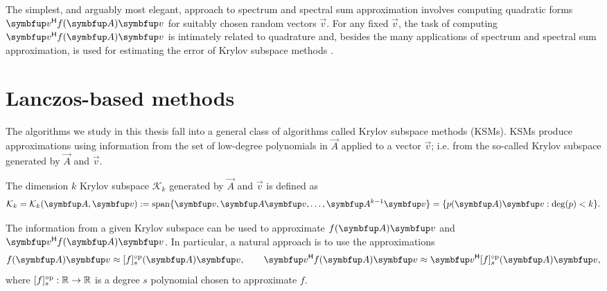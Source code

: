 The simplest, and arguably most elegant, approach to spectrum and spectral sum approximation involves computing quadratic forms \( \vec{v}^\cT \fA \vec{v} \) for suitably chosen random vectors \( \vec{v} \).
For any fixed \( \vec{v} \), the task of computing \( \vec{v}^\cT \fA \vec{v} \) is intimately related to quadrature \cite{golub_meurant_94,golub_meurant_09} and, besides the many applications of spectrum and spectral sum approximation, is used for estimating the error of Krylov subspace methods \cite{dahlquist_eisenstat_golub_72,golub_strakos_94,golub_meurant_09}.



\section{Lanczos-based methods}
\label{sec:lanczos}

The algorithms we study in this thesis fall into a general class of algorithms called Krylov subspace methods (KSMs).
KSMs produce approximations using information from the set of low-degree polynomials in \( \vec{A} \) applied to a vector \( \vec{v} \); i.e. from the so-called Krylov subspace generated by \( \vec{A} \) and \( \vec{v} \).
\begin{definition}
    \label{def:Kk}
    The dimension \( k \) Krylov subspace \( \mathcal{K}_k \) generated by \( \vec{A} \) and \( \vec{v} \) is defined as
\begin{equation*}
    \mathcal{K}_{k} 
    =\mathcal{K}_{k}(\vec{A},\vec{v}) 
    := \operatorname{span}\{\vec{v}, \vec{A}\vec{v}, \ldots, \vec{A}^{k-1}\vec{v} \}
    = \{ \pA\vec{v} : \deg(p) < k \}.
\end{equation*}
\end{definition}

The information from a given Krylov subspace can be used to approximate \( \fA \vec{v} \) and \( \vec{v}^\cT \fA \vec{v} \).
In particular, a natural approach is to use the approximations 
\begin{equation*}
    \fA \vec{v} \approx  \ff{f}{s}\mf{\vec{A}} \vec{v}
    ,\qquad
    \vec{v}^\cT \fA \vec{v} \approx  \vec{v}^\cT \ff{f}{s}\mf{\vec{A}} \vec{v},
\end{equation*}
where \( \ff{f}{s} : \R\to\R \) is a degree \( s \) polynomial chosen to approximate \( f \).

